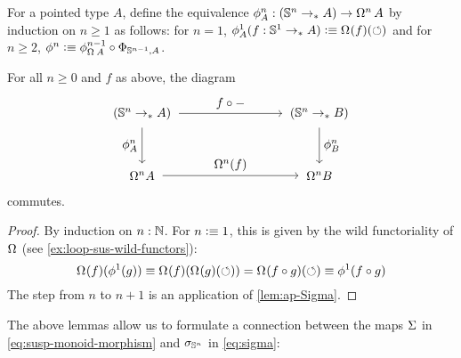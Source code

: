 \documentclass[english,a4paper]{lmcs}
\begin{document}
For a pointed type $A$, define the equivalence $\phi_A^n: ({\mathbb S^{n}} \to_\ast A) \to
\mathop{\Omega^{n}} A$ by induction on $n\geq 1$ as follows: for $n=1$,
$\phi_A^1(f:\Sc \ptdto A) \defequi \loopspace\null (f)(\Sloop)$ and for $n\geq
2$, $\phi^n \defequi \phi_{\loopspace\null A}^{n-1} \circ \Phi_{\Sn {n-1},A}$.
\begin{cor}\label{lem:iterated-ap-Sigma}
    For all $n \geq 0$ and $f$ as above, the diagram
    \begin{equation}
    \begin{tikzpicture}[x=5cm,y=-1.75cm,baseline=(current bounding box.center)]
    \tikzset{arrow/.style={shorten >=0.1cm,shorten <=.1cm,->}}
    \node (A) at (0,0) {$(\Sn n \to_* A)$};
    \node (D) at (1,0) {$(\Sn n \to_* B)$};
    \node (B) at (0,1) {$\Omega^n A$};
    \node (C) at (1,1) {$\Omega^n B$};

    \draw[arrow] (A) to node [above] {$f \circ \blank$} (D);
    \draw[arrow] (A) to node [left] {$\phi_A^n$} (B);
    \draw[arrow] (B) to node [above] {$\Omega^n(f)$} (C);
    \draw[arrow] (D) to node [right] {$\phi_B^n$} (C);
    \end{tikzpicture}
    \end{equation}
    commutes.
\end{cor}
\begin{proof}
  By induction on $n:\mathbb{N}$. For $n\vcentcolon\equiv 1$, this is given by the wild functoriality of
  $\loopspace\null$ (see \cref{ex:loop-sus-wild-functors}):
  \begin{displaymath}
    \loopspace \null (f) (\phi^1 (g)) \jdeq \loopspace\null(f)(\loopspace\null(g)(\Sloop))
    =\loopspace\null(f\circ g)(\Sloop) \jdeq \phi^1(f\circ g)
  \end{displaymath}
  The step from $n$ to $n+1$ is an application of \cref{lem:ap-Sigma}.
\end{proof}


The above lemmas allow us to formulate a connection between the maps $\operatorname{\Sigma}$ in
\eqref{eq:susp-monoid-morphism} and $\sigma_{{\mathbb S^{n}}}$ in \eqref{eq:sigma}:
\end{document}
